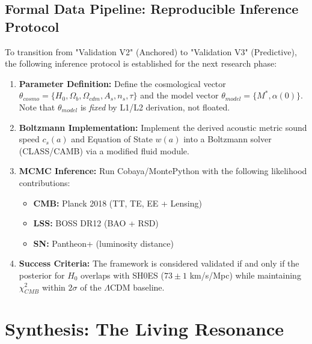 \documentclass[a4paper,12pt]{article}
\begin{document}
\subsection{Formal Data Pipeline: Reproducible Inference Protocol}
To transition from "Validation V2" (Anchored) to "Validation V3" (Predictive), the following inference protocol is established for the next research phase:

\begin{enumerate}
    \item \textbf{Parameter Definition:}
    Define the cosmological vector $\theta_{cosmo} = \{H_0, \Omega_b, \Omega_{cdm}, A_s, n_s, \tau\}$ and the model vector $\theta_{model} = \{M^*, \alpha(0)\}$.
    Note that $\theta_{model}$ is \emph{fixed} by L1/L2 derivation, not floated.

    \item \textbf{Boltzmann Implementation:}
    Implement the derived acoustic metric sound speed $c_s(a)$ and Equation of State $w(a)$ into a Boltzmann solver (CLASS/CAMB) via a modified fluid module.

    \item \textbf{MCMC Inference:}
    Run Cobaya/MontePython with the following likelihood contributions:
    \begin{itemize}
        \item \textbf{CMB:} Planck 2018 (TT, TE, EE + Lensing)
        \item \textbf{LSS:} BOSS DR12 (BAO + RSD)
        \item \textbf{SN:} Pantheon+ (luminosity distance)
    \end{itemize}

    \item \textbf{Success Criteria:}
    The framework is considered validated if and only if the posterior for $H_0$ overlaps with SH0ES ($73 \pm 1$ km/s/Mpc) while maintaining $\chi^2_{CMB}$ within $2\sigma$ of the $\Lambda$CDM baseline.
\end{enumerate}

\section{Synthesis: The Living Resonance}
\end{document}
